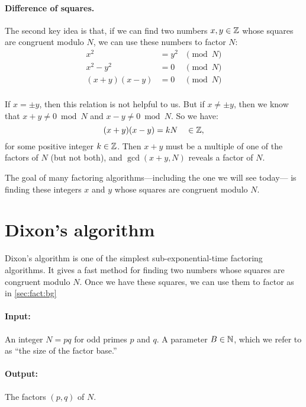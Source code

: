 \paragraph{Difference of squares.}
The second key idea is that, if we can find two numbers $x,y \in \mathbb{Z}$ whose
squares are congruent modulo $N$, we can use these numbers to factor $N$:
\begin{align*}
x^2 &= y^2 &\pmod N \\
x^2 - y^2 &= 0 &\pmod N\\
(x+y)(x-y) &= 0 &\pmod N\\
\end{align*}

If $x = \pm y$, then this relation is not helpful to us.
But if $x \neq \pm y$, then we know that
$x+y \neq 0 \bmod N$ and $x-y \neq 0 \bmod N$.
So we have:
\[ (x+y)(x-y) = kN \quad \in \mathbb{Z},\]
for some positive integer $k \in \mathbb{Z}$.
Then $x+y$ must be a multiple of one of the factors of $N$ (but not both),
and $\gcd(x+y, N)$ reveals a factor of $N$. 

The goal of many factoring algorithms---including the one we will see today---%
is finding these integers $x$ and $y$ whose squares are congruent modulo $N$.

\section{Dixon's algorithm}

Dixon's algorithm is one of the simplest sub-exponential-time factoring algorithms.
It gives a fast method for finding two numbers whose squares are congruent modulo $N$.
Once we have these squares, we can use them to factor as in \cref{sec:fact:bg}


\paragraph{Input:} An integer $N = pq$ for odd primes $p$ and $q$. A parameter $B \in \mathbb{N}$,
which we refer to as ``the size of the factor base.''

\paragraph{Output:} The factors $(p,q)$ of $N$.


